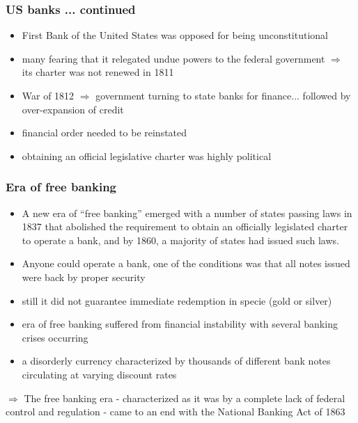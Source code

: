 \documentclass[11pt]{beamer}
\begin{document}
\begin{frame}
\frametitle{US banks ... continued}
\begin{itemize}
\item First Bank of the United States was opposed for being unconstitutional
\item many fearing that it relegated undue powers to the federal government $\Rightarrow$ its charter was not renewed in 1811
\item War of 1812 $\Rightarrow$ government turning to state banks for finance... followed by over-expansion of credit
\item financial order needed to be reinstated
\item obtaining an official legislative charter was highly political



\end{itemize}
\end{frame}

\begin{frame}
\frametitle {Era of free banking}
\begin{itemize}
\item A new era of “free banking” emerged with a number of states passing laws in 1837 that abolished the requirement to obtain an officially legislated charter to operate a bank, and by 1860, a majority of states had issued such laws.
\item Anyone could operate a bank, one of the conditions was that all notes issued were back by proper security
\item still it did not guarantee immediate redemption in specie (gold or silver)
\item era of free banking suffered from financial instability with several banking crises occurring
\item  a disorderly currency characterized by thousands of different bank notes circulating at varying discount rates


\end{itemize}
$\Rightarrow$ The free banking era - characterized as it was by a complete lack of federal control and regulation - came to an end with the National Banking Act of 1863

\end{frame}
\end{document}
